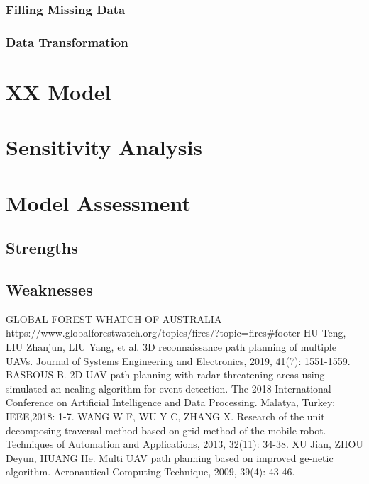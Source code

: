 \documentclass[12pt]{article}  %
\begin{document}
\subsubsection{Filling Missing Data}

\subsubsection{Data Transformation}

\section{XX Model}

\section{Sensitivity Analysis}
	
\section{Model Assessment}

\subsection{Strengths}

\subsection{Weaknesses}


\clearpage   %
\begin{thebibliography}{99}
     GLOBAL FOREST WHATCH OF AUSTRALIA https://www.globalforestwatch.org/topics/fires/?topic=fires\#footer
	 HU Teng, LIU Zhanjun, LIU Yang, et al. 3D reconnaissance path planning of multiple UAVs. Journal of Systems Engineering and Electronics, 2019, 41(7): 1551-1559.
	 BASBOUS B. 2D UAV path planning with radar threatening areas using simulated an-nealing algorithm for event detection. The 2018 International Conference on Artificial Intelligence and Data Processing. Malatya, Turkey: IEEE,2018: 1-7.
	 WANG W F, WU Y C, ZHANG X. Research of the unit decomposing traversal method based on grid method of the mobile robot. Techniques of Automation and Applications, 2013, 32(11): 34-38.
	 XU Jian, ZHOU Deyun, HUANG He. Multi UAV path planning based on improved ge-netic algorithm. Aeronautical Computing Technique, 2009, 39(4): 43-46.

\end{thebibliography}


% 
\end{document}
